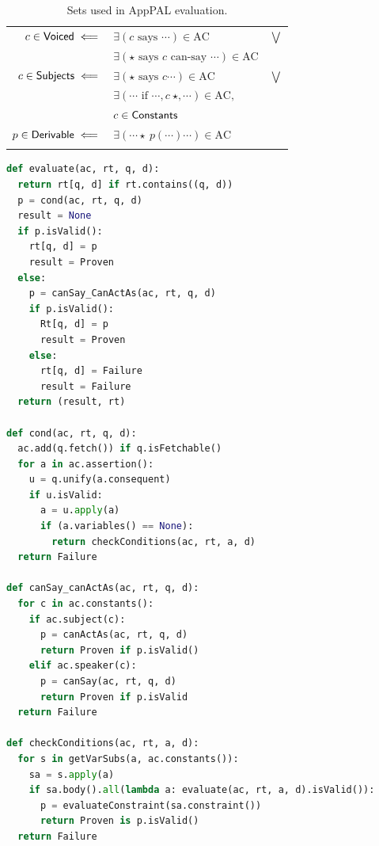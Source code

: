\documentclass[thesis.tex]{subfiles}
\begin{document}
\begin{table}
  \centering
  \newcommand{\myset}[1]{\ensuremath{\text{\sffamily #1}}}
  \begin{tabular}{r l c}
    \toprule
    $c \in \myset{Voiced} \impliedby$     & $\exists \left(c \text{~says~} \cdots\right) \in \text{AC}$                        & $\bigvee$ \\
                                          & $\exists \left(\star \text{~says~} c \text{~can-say~} \cdots\right) \in \text{AC}$ &           \\
    $c \in \myset{Subjects} \impliedby$   & $\exists \left(\star \text{~says~} c\cdots\right) \in \text{AC}$                   & $\bigvee$ \\
                                          & $\exists \left(\cdots \text{~if~} \cdots,c~\star,\cdots\right) \in \text{AC},$     &           \\
                                          & $c \in \myset{Constants}$                                                          &           \\
    $p \in \myset{Derivable} \impliedby$  & $\exists \left( \cdots \star~p\left(\cdots\right) \cdots\right) \in \text{AC}$     &           \\
    \bottomrule                          \\
  \end{tabular}
  \caption{Sets used in AppPAL evaluation.}
\end{table}


\begin{lstlisting}[language=Python, float, caption={Pseudocode for evaluating AppPAL.}]
def evaluate(ac, rt, q, d):
  return rt[q, d] if rt.contains((q, d))
  p = cond(ac, rt, q, d)
  result = None
  if p.isValid():
    rt[q, d] = p
    result = Proven
  else:
    p = canSay_CanActAs(ac, rt, q, d)
    if p.isValid():
      Rt[q, d] = p
      result = Proven
    else:
      rt[q, d] = Failure
      result = Failure
  return (result, rt)

def cond(ac, rt, q, d):
  ac.add(q.fetch()) if q.isFetchable()
  for a in ac.assertion():
    u = q.unify(a.consequent)
    if u.isValid:
      a = u.apply(a)
      if (a.variables() == None):
        return checkConditions(ac, rt, a, d)
  return Failure

def canSay_canActAs(ac, rt, q, d):
  for c in ac.constants():
    if ac.subject(c):
      p = canActAs(ac, rt, q, d)
      return Proven if p.isValid()
    elif ac.speaker(c):
      p = canSay(ac, rt, q, d)
      return Proven if p.isValid
  return Failure

def checkConditions(ac, rt, a, d):
  for s in getVarSubs(a, ac.constants()):
    sa = s.apply(a)
    if sa.body().all(lambda a: evaluate(ac, rt, a, d).isValid()):
      p = evaluateConstraint(sa.constraint())
      return Proven is p.isValid()
  return Failure
\end{lstlisting}
\end{document}
